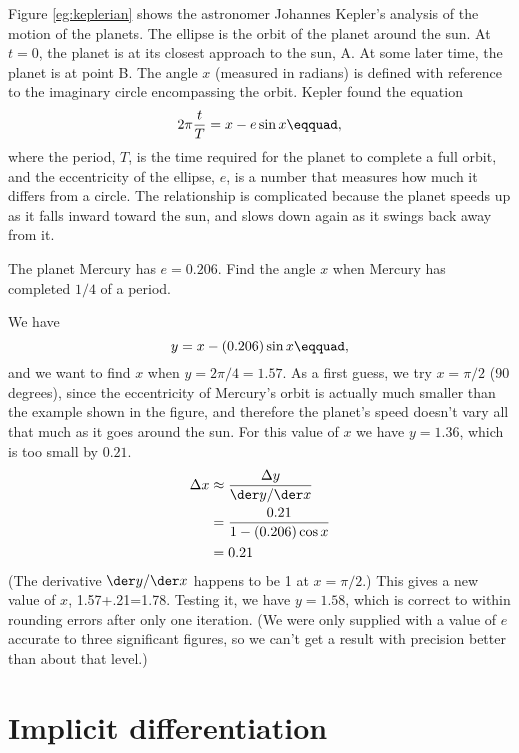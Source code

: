 
\begin{eg}\label{eg:keplerian}
\egquestion Figure \ref{eg:keplerian} shows the astronomer Johannes Kepler's analysis
of the motion of the planets. The ellipse is the orbit of the planet around
the sun. At $t=0$, the planet is at its closest approach to the sun, A. At some
later time, the planet is at point B. The angle $x$ (measured in radians) is defined with reference
to the imaginary circle encompassing the orbit. Kepler found the equation
\begin{equation*}
  2\pi \frac{t}{T} = x-e\sin x\eqquad,
\end{equation*}
where the period, $T$, is the time required for the planet to complete a full orbit, and
the eccentricity of the ellipse, $e$, is a number that measures how much it
differs from a circle. The relationship is complicated because the planet
speeds up as it falls inward toward the sun, and slows down again as it swings
back away from it.

The planet Mercury has $e=0.206$. Find the angle $x$
when Mercury has completed $1/4$ of a period.

\eganswer We have
\begin{equation*}
  y = x-(0.206)\sin x\eqquad,
\end{equation*}
and we want to find $x$ when $y=2\pi/4=1.57$. As a first guess, we try $x=\pi/2$ (90 degrees), since the eccentricity of Mercury's
orbit is actually much smaller than the example shown in the figure, and
therefore the planet's speed doesn't vary all that much as it goes around the sun.
For this value of $x$ we have $y=1.36$, which is too small by $0.21$.
\begin{align*}
  \Delta x &\approx \frac{\Delta y}{\der y/\der x} \\
           &= \frac{0.21}{1-(0.206)\cos x} \\
           &= 0.21
\end{align*}
(The derivative $\der y/\der x$ happens to be 1 at $x=\pi/2$.) This gives a new value of $x$, 1.57+.21=1.78.
Testing it, we have $y=1.58$, which is correct to within rounding errors after only one iteration.
(We were only supplied with a value of $e$ accurate to three significant figures, so we can't get a result
with precision better than about that level.)
\end{eg}

\section{Implicit differentiation}

